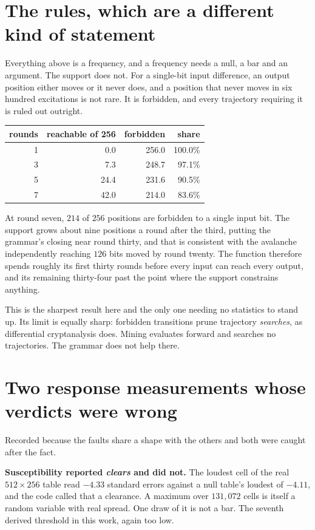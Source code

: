\section{The rules, which are a different kind of statement}

Everything above is a frequency, and a frequency needs a null, a bar and an argument. The support does not. For a single-bit input difference, an output position either moves or it never does, and a position that never moves in six hundred excitations is not rare. It is forbidden, and every trajectory requiring it is ruled out outright.

\begin{center}
\begin{tabular}{@{}rrrr@{}}
\toprule
rounds & reachable of 256 & forbidden & share \\
\midrule
1 & 0.0 & 256.0 & 100.0\% \\
3 & 7.3 & 248.7 & 97.1\% \\
5 & 24.4 & 231.6 & 90.5\% \\
7 & 42.0 & 214.0 & 83.6\% \\
\bottomrule
\end{tabular}
\end{center}

At round seven, \(214\) of \(256\) positions are forbidden to a single input bit. The support grows about nine positions a round after the third, putting the grammar's closing near round thirty, and that is consistent with the avalanche independently reaching \(126\) bits moved by round twenty. The function therefore spends roughly its first thirty rounds before every input can reach every output, and its remaining thirty-four past the point where the support constrains anything.

This is the sharpest result here and the only one needing no statistics to stand up. Its limit is equally sharp: forbidden transitions prune trajectory \emph{searches}, as differential cryptanalysis does. Mining evaluates forward and searches no trajectories. The grammar does not help there.

\section{Two response measurements whose verdicts were wrong}

Recorded because the faults share a shape with the others and both were caught after the fact.

\textbf{Susceptibility reported \emph{clears} and did not.} The loudest cell of the real \(512 \times 256\) table read \(-4.33\) standard errors against a null table's loudest of \(-4.11\), and the code called that a clearance. A maximum over \(131{,}072\) cells is itself a random variable with real spread. One draw of it is not a bar. The seventh derived threshold in this work, again too low.

